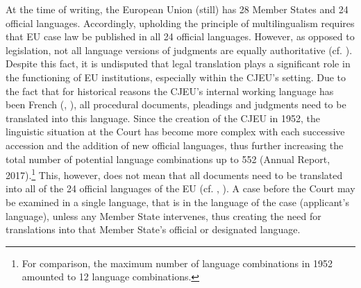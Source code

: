 \documentclass[output=paper]{langsci/langscibook}
\begin{document}
At the time of writing, the European Union (still) has 28 Member States and 24 official languages. Accordingly, upholding the principle of multilingualism requires that EU case law be published in all 24 official languages. However, as opposed to legislation, not all language versions of judgments are equally authoritative (cf. \citealt[69]{Kjær2007}). Despite this fact, it is undisputed that legal translation plays a significant role in the functioning of EU institutions, especially within the CJEU’s setting. Due to the fact that for historical reasons the CJEU’s internal working language has been French (\citealt[487]{McAuliffe2013a}, \citeyear[865]{McAuliffe2013b}), all procedural documents, pleadings and judgments need to be translated into this language. Since the creation of the CJEU in 1952, the linguistic situation at the Court has become more complex with each successive accession and the addition of new official languages, thus further increasing the total number of potential language combinations up to 552 (Annual Report, 2017).\footnote{For comparison, the maximum number of language combinations in 1952 amounted to 12 language combinations.} This, however, does not mean that all documents need to be translated into all of the 24 official languages of the EU (cf. \citealt{McAuliffe2012}, \citealt[250]{Künnecke2013}). A case before the Court may be examined in a single language, that is in the language of the case (applicant’s language), unless any Member State intervenes, thus creating the need for translations into that Member State’s official or designated language.
\end{document}
